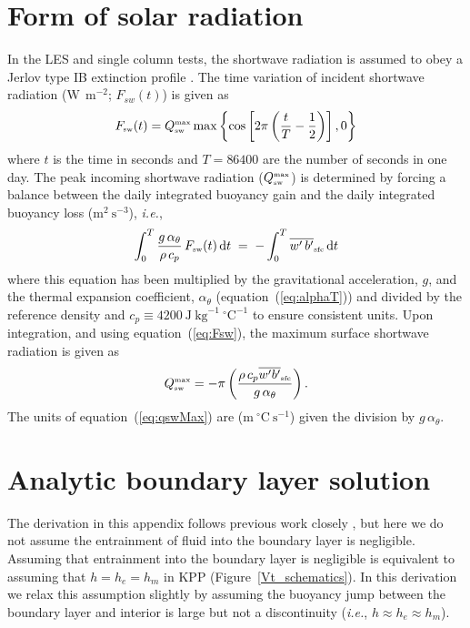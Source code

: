 \documentclass[preprint,12pt,authoryear]{agujournal}
\begin{document}
\section{Form of solar radiation}
\label{shortwave:desc}
In the LES and single column tests, the shortwave radiation is assumed to obey a Jerlov type IB extinction profile \citep{Paulson1977}.  The time variation of incident shortwave radiation ($\mbox{W}~\mbox{}~\mbox{m}^{-2}$; $F_{sw}(t)$) is given as
\begin{equation}
\label{eq:Fsw}
F_{\mbox{\tiny sw}}(t) = Q_{\mbox{\tiny sw}}^{\mbox{\tiny max}} \max \left\{\cos \left[2 \pi \left(\frac{t}{T} - \frac{1}{2}\right)\right],0\right\}
\end{equation}
where $t$ is the time in seconds and $T=86400$ are the number of seconds in one day.  The peak incoming shortwave radiation ($Q_{\mbox{\tiny  sw}}^{\mbox{\tiny max}}$) is determined by forcing a balance between the daily integrated buoyancy gain and the daily integrated buoyancy loss ($\mbox{m}^2~\mbox{s}^{-3}$), \textit{i.e.},
\begin{equation}
\label{surface:solar}
\int_0^T \frac{g \, \alpha_{\theta}}{\rho \, c_p} \, F_{\mbox{\tiny sw}}(t) \, \mathrm{d}t \; 
= \; -\int_0^T \overline{w^\prime \, b^\prime}_{\mbox{\tiny sfc}}  \, \mathrm{d}t
\end{equation}
where this equation has been multiplied by the gravitational acceleration, $g$, and the thermal expansion coefficient, $\alpha_{\theta}$ (equation~(\ref{eq:alphaT})) and divided by the reference density and $c_p \equiv 4200 ~\mbox{J}~\mbox{kg}^{-1}~^{\circ}\mbox{C}^{-1}$ to ensure consistent units. Upon integration, and using equation~(\ref{eq:Fsw}), the maximum surface shortwave radiation is given as
\begin{equation}
\label{eq:qswMax}
Q_{\mbox{\tiny sw}}^{\mbox{\tiny max}} = 
-\pi \left( \frac{\rho \, c_p
\overline{w^\prime b^\prime}_{\mbox{\tiny sfc}} }  {g \, \alpha_{\theta}}
 \right).
\end{equation}
The units of equation~(\ref{eq:qswMax}) are ($\mbox{m}~\mbox{}^{\circ}\mbox{C}~\mbox{s}^{-1}$) given the division by $g \, \alpha_{\theta}$.  

\section{Analytic boundary layer solution}
\label{analytic}

The derivation in this appendix follows previous work closely \citep{turner1973bouyancy,haine1998gravitational}, but here we do not assume the entrainment of fluid into the boundary layer is negligible.  Assuming that entrainment into the boundary layer is negligible is equivalent to assuming that $h = h_e = h_m$ in KPP (Figure~\ref{Vt_schematics}).  In this derivation we relax this assumption slightly by assuming the buoyancy jump between the boundary layer and interior is large but not a discontinuity (\textit{i.e.}, $h \approx h_e \approx h_m$).
\end{document}
